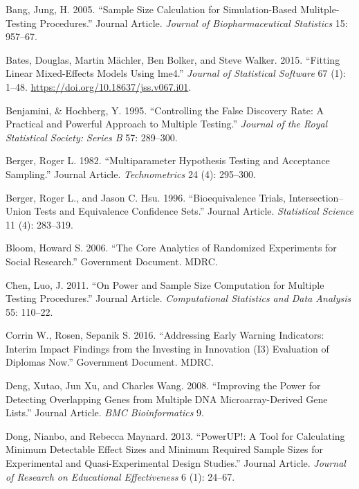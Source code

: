 \documentclass[
]{article}
\newlength{\cslhangindent}
\newlength{\cslentryspacingunit} %
\newenvironment{CSLReferences}[2] %
 {%
  \setlength{\parindent}{0pt}
  \ifodd #1
  \let\oldpar\par
  \def\par{\hangindent=\cslhangindent\oldpar}
  \fi
  \setlength{\parskip}{#2\cslentryspacingunit}
 }%
 {}
\begin{document}
\hypertarget{refs}{}
\begin{CSLReferences}{1}{0}
\leavevmode{}%
Bang, Jung, H. 2005. {``Sample Size Calculation for Simulation-Based
Mulitple-Testing Procedures.''} Journal Article. \emph{Journal of
Biopharmaceutical Statistics} 15: 957--67.

\leavevmode{}%
Bates, Douglas, Martin Mächler, Ben Bolker, and Steve Walker. 2015.
{``Fitting Linear Mixed-Effects Models Using {lme4}.''} \emph{Journal of
Statistical Software} 67 (1): 1--48.
\url{https://doi.org/10.18637/jss.v067.i01}.

\leavevmode{}%
Benjamini, \& Hochberg, Y. 1995. {``Controlling the False Discovery
Rate: A Practical and Powerful Approach to Multiple Testing.''}
\emph{Journal of the Royal Statistical Society: Series B} 57: 289--300.

\leavevmode{}%
Berger, Roger L. 1982. {``Multiparameter Hypothesis Testing and
Acceptance Sampling.''} Journal Article. \emph{Technometrics} 24 (4):
295--300.

\leavevmode{}%
Berger, Roger L., and Jason C. Hsu. 1996. {``Bioequivalence Trials,
Intersection--Union Tests and Equivalence Confidence Sets.''} Journal
Article. \emph{Statistical Science} 11 (4): 283--319.

\leavevmode{}%
Bloom, Howard S. 2006. {``The Core Analytics of Randomized Experiments
for Social Research.''} Government Document. MDRC.

\leavevmode{}%
Chen, Luo, J. 2011. {``On Power and Sample Size Computation for Multiple
Testing Procedures.''} Journal Article. \emph{Computational Statistics
and Data Analysis} 55: 110--22.

\leavevmode{}%
Corrin W., Rosen, Sepanik S. 2016. {``Addressing Early Warning
Indicators: Interim Impact Findings from the Investing in Innovation
(I3) Evaluation of Diplomas Now.''} Government Document. MDRC.

\leavevmode{}%
Deng, Xutao, Jun Xu, and Charles Wang. 2008. {``Improving the Power for
Detecting Overlapping Genes from Multiple DNA Microarray-Derived Gene
Lists.''} Journal Article. \emph{BMC Bioinformatics} 9.

\leavevmode{}%
Dong, Nianbo, and Rebecca Maynard. 2013. {``PowerUP!: A Tool for
Calculating Minimum Detectable Effect Sizes and Minimum Required Sample
Sizes for Experimental and Quasi-Experimental Design Studies.''} Journal
Article. \emph{Journal of Research on Educational Effectiveness} 6 (1):
24--67.


\end{CSLReferences}
\end{document}
